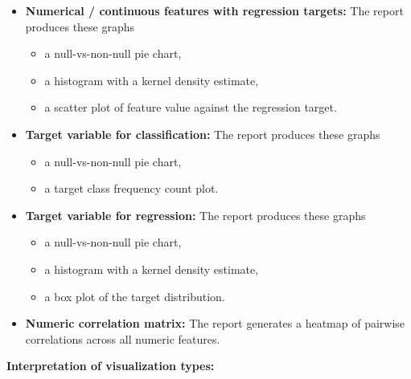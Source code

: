 \begin{itemize}
    \begin{itemize}
      \item a null-vs-non-null pie chart,
      \item a histogram with a kernel density estimate,
      \item a box plot of the feature grouped by class label.
    \end{itemize}
  \item \textbf{Numerical / continuous features with regression targets:} The report  produces these graphs
    \begin{itemize}
      \item a null-vs-non-null pie chart,
      \item a histogram with a kernel density estimate,
      \item a scatter plot of feature value against the regression target.
    \end{itemize}
  \item \textbf{Target variable for classification:} The report produces these graphs
    \begin{itemize}
      \item a null-vs-non-null pie chart,
      \item a target class frequency count plot.
    \end{itemize}
  \item \textbf{Target variable for regression:} The report produces these graphs
    \begin{itemize}
      \item a null-vs-non-null pie chart,
      \item a histogram with a kernel density estimate,
      \item a box plot of the target distribution.
    \end{itemize}
  \item \textbf{Numeric correlation matrix:} The report generates a heatmap of pairwise correlations across all numeric features.
\end{itemize}
\textbf{Interpretation of visualization types:}
